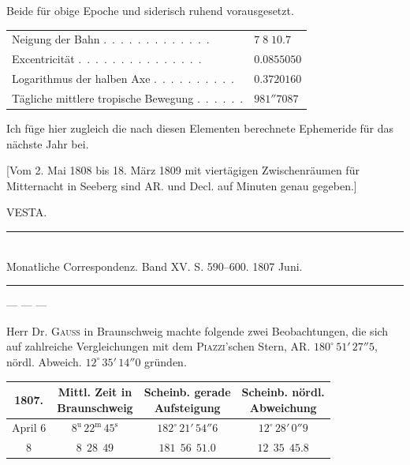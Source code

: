 \noindent Beide für obige Epoche und siderisch ruhend vorausgesetzt.

\begin{center}\begingroup\fontsize{9}{11}\selectfont
\begin{tabular}{ll}
Neigung der Bahn .\ .\ .\ .\ .\ .\ .\ .\ .\ .\ .\ .\ . & $7\;8\;10.7$ \\
Excentricität .\ .\ .\ .\ .\ .\ .\ .\ .\ .\ .\ .\ .\ .\ . & $0.0855050$ \\
Logarithmus der halben Axe .\ .\ .\ .\ .\ .\ .\ .\ .\ . & $0.3720160$ \\
Tägliche mittlere tropische Bewegung .\ .\ .\ .\ .\ . & $981''7087$
\end{tabular}\endgroup\end{center}

\par\indent Ich füge hier zugleich die nach diesen Elementen berechnete Ephemeride für das nächste Jahr bei.

[Vom 2. Mai 1808 bis 18. März 1809 mit viertägigen Zwischenräumen für Mitternacht in Seeberg sind AR. und Decl. auf Minuten genau gegeben.]

\clearpage{}
\begin{center}
VESTA.
\end{center}

\begin{center}
\rule{0.6\linewidth}{0.4pt}\\
Monatliche Correspondenz. Band XV. S. 590–600. 1807 Juni.\\
\rule{0.6\linewidth}{0.4pt}
\end{center}

--- --- ---

\par\indent Herr Dr. \textsc{Gauss} in Braunschweig machte folgende zwei Beobachtungen, die sich auf zahlreiche Vergleichungen mit dem \textsc{Piazzi}'schen Stern, AR. $180^\circ\,51'\,27''5$, nördl. Abweich. $12^\circ\,35'\,14''0$ gründen.

\begin{center}\begingroup
\fontsize{10}{12}\selectfont
\setlength{\tabcolsep}{2.5pt}\renewcommand{\arraystretch}{1.15}
\begin{tabular}{c|c|c|c}
1807. & \shortstack{Mittl. Zeit in\\Braunschweig} & \shortstack{Scheinb. gerade\\Aufsteigung \VestaRATwoNinety{}} & \shortstack{Scheinb. nördl.\\Abweichung \VestaDecTwoNinety{}} \\ \hline
April 6 & $8^{\text{u}}\,22^{\text{m}}\,45^{\text{s}}$ & $182^\circ\,21'\,54''6$ & $12^\circ\,28'\,0''9$ \\
8 & $8\ \ 28\ \ 49$ & $181\ \ 56\ \ 51.0$ & $12\ \ 35\ \ 45.8$
\end{tabular}\endgroup\end{center}

